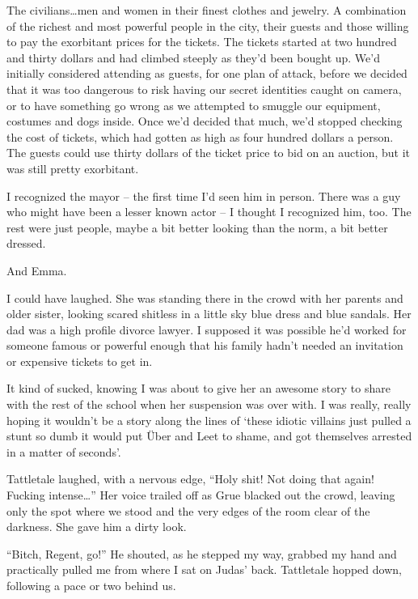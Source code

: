 The civilians\ldots men and women in their finest clothes and jewelry.  A combination of the richest and most powerful people in the city, their guests and those willing to pay the exorbitant prices for the tickets.  The tickets started at two hundred and thirty dollars and had climbed steeply as they'd been bought up.  We'd initially considered attending as guests, for one plan of attack, before we decided that it was too dangerous to risk having our secret identities caught on camera, or to have something go wrong as we attempted to smuggle our equipment, costumes and dogs inside.  Once we'd decided that much, we'd stopped checking the cost of tickets, which had gotten as high as four hundred dollars a person.  The guests could use thirty dollars of the ticket price to bid on an auction, but it was still pretty exorbitant.



I recognized the mayor – the first time I'd seen him in person.  There was a guy who might have been a lesser known actor – I thought I recognized him, too.  The rest were just people, maybe a bit better looking than the norm, a bit better dressed.



And Emma.



I could have laughed.  She was standing there in the crowd with her parents and older sister, looking scared shitless in a little sky blue dress and blue sandals. Her dad was a high profile divorce lawyer.  I supposed it was possible he'd worked for someone famous or powerful enough that his family hadn't needed an invitation or expensive tickets to get in.



It kind of sucked, knowing I was about to give her an awesome story to share with the rest of the school when her suspension was over with.  I was really, really hoping it wouldn't be a story along the lines of `these idiotic villains just pulled a stunt so dumb it would put \"{U}ber and Leet to shame, and got themselves arrested in a matter of seconds'.



Tattletale laughed, with a nervous edge, ``Holy shit!  Not doing that again!  Fucking intense\ldots'' Her voice trailed off as Grue blacked out the crowd, leaving only the spot where we stood and the very edges of the room clear of the darkness.  She gave him a dirty look.



``Bitch, Regent, go!'' He shouted, as he stepped my way, grabbed my hand and practically pulled me from where I sat on Judas' back.  Tattletale hopped down, following a pace or two behind us.



